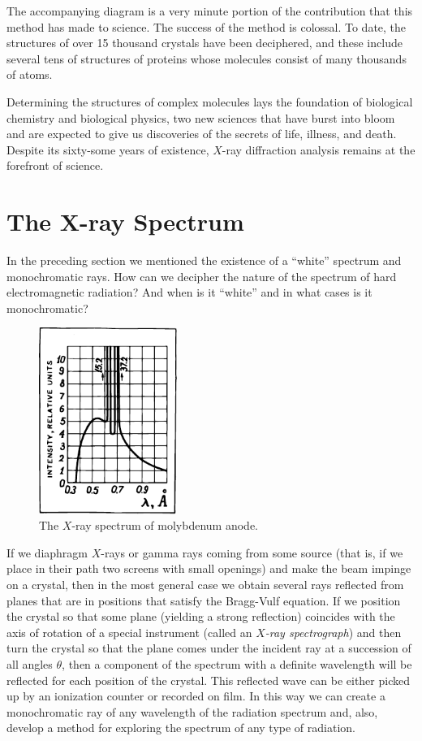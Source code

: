 The accompanying diagram is a very minute portion of the contribution that this method has made to science. The success of the method is colossal. To date, the struc­tures of over 15 thousand crystals have been deciphered, and these include several tens of structures of proteins whose molecules consist of many thousands of atoms. 

Determining the structures of complex molecules lays the foundation of biological chemistry and biological physics, two new sciences that have burst into bloom and are expected to give us discoveries of the secrets of life, illness, and death. Despite its sixty-some years of existence, $X$-ray diffraction analysis remains at the forefront of science.

\section{The X-ray Spectrum}

In the preceding section we mentioned the existence of a ``white'' spectrum and monochromatic rays. How can we decipher the nature of the spectrum of hard electromagnetic radiation? And when is it ``white'' and in what cases is it monochromatic?
\begin{figure}[!ht]
\centering
\includegraphics[width=0.4\textwidth]{figures/fig-03-04.pdf}
\caption{The $X$-ray spectrum of molybdenum anode.}
\label{fig-3.4}
\end{figure}

If we diaphragm $X$-rays or gamma rays coming from some source (that is, if we place in their path two screens with small openings) and make the beam impinge on a crystal, then in the most general case we obtain several rays reflected from planes that are in positions that sat­isfy the Bragg-Vulf equation. If we position the crystal so that some plane (yielding a strong reflection) coincides with the axis of rotation of a special instrument (called an \emph{$X$-ray spectrograph}) and then turn the crystal so that the plane comes under the incident ray at a succession of all angles $\theta$, then a component of the spectrum with a definite wavelength will be reflected for each position of the crystal. This reflected wave can be either picked up by an ionization counter or recorded on film. In this way we can create a monochromatic ray of any wavelength of the radiation spectrum and, also, develop a method for exploring the spectrum of any type of radiation.

